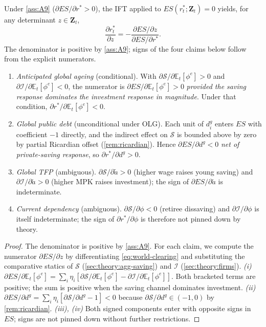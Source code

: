 \begin{proposition}\label{prop:cs-rstar}
Under \cref{ass:A9} ($\partial ES/\partial r^*>0$), the IFT applied to
$ES(r_t^*;\mathbf Z_t)=0$ yields, for any determinant $z\in\mathbf Z_t$,
\[
\frac{\partial r_t^*}{\partial z}=-\frac{\partial ES/\partial z}{\partial ES/\partial r^*}.
\]
The denominator is positive by \cref{ass:A9}; signs of the four claims below
follow from the explicit numerators.
\begin{enumerate}
\item[(i)] \emph{Anticipated global ageing} (conditional). With
$\partial \mathcal{S}/\partial \mathbb{E}_t[\phi^e]>0$ and
$\partial \mathcal{I}/\partial \mathbb{E}_t[\phi^e]<0$, the numerator is
$\partial ES/\partial \mathbb{E}_t[\phi^e]>0$ \emph{provided the saving
response dominates the investment response in magnitude}. Under that
condition, $\partial r^*/\partial \mathbb{E}_t[\phi^e]<0$.
\item[(ii)] \emph{Global public debt} (unconditional under OLG). Each unit of
$d_i^g$ enters $ES$ with coefficient $-1$ directly, and the indirect effect on
$\mathcal{S}$ is bounded above by zero by partial Ricardian offset
(\cref{rem:ricardian}). Hence $\partial ES/\partial d^g<0$ \emph{net of
private-saving response}, so $\partial r^*/\partial d^g>0$.
\item[(iii)] \emph{Global TFP} (ambiguous). $\partial \mathcal{S}/\partial\tilde a>0$
(higher wage raises young saving) and $\partial\mathcal{I}/\partial\tilde a>0$
(higher MPK raises investment); the sign of $\partial ES/\partial \tilde a$ is
indeterminate.
\item[(iv)] \emph{Current dependency} (ambiguous). $\partial\mathcal{S}/\partial\phi<0$
(retiree dissaving) and $\partial\mathcal{I}/\partial\phi$ is itself
indeterminate; the sign of $\partial r^*/\partial\phi$ is therefore not pinned
down by theory.
\end{enumerate}
\end{proposition}

\begin{proof}
The denominator is positive by \cref{ass:A9}. For each claim, we compute the
numerator $\partial ES/\partial z$ by differentiating \eqref{eq:world-clearing}
and substituting the comparative statics of $\mathcal{S}$
(\cref{sec:theory:agg-saving}) and $\mathcal{I}$ (\cref{sec:theory:firms}).
\emph{(i)} $\partial ES/\partial \mathbb{E}_t[\phi^e]=\sum_i\eta_i[\partial\mathcal{S}/\partial \mathbb{E}_t[\phi^e]-\partial\mathcal{I}/\partial \mathbb{E}_t[\phi^e]]$.
Both bracketed terms are positive; the sum is positive when the saving channel
dominates investment. \emph{(ii)} $\partial ES/\partial d^g=\sum_i\eta_i[\partial\mathcal{S}/\partial d^g-1]<0$
because $\partial\mathcal{S}/\partial d^g\in (-1,0)$ by \cref{rem:ricardian}.
\emph{(iii), (iv)} Both signed components enter with opposite signs in
$ES$; signs are not pinned down without further restrictions.
\end{proof}

